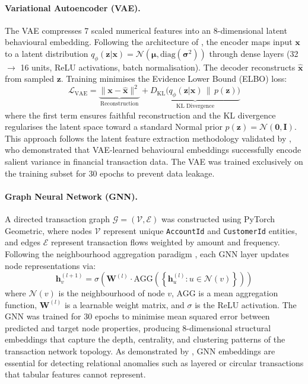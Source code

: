 \documentclass[a4paper,fleqn]{cas-sc}
\begin{document}
\paragraph{Variational Autoencoder (VAE).}
The VAE compresses 7 scaled numerical features into an 8-dimensional latent behavioural embedding. Following the architecture of \cite{Kingma2014VAE}, the encoder maps input $\mathbf{x}$ to a latent distribution $q_\phi(\mathbf{z}|\mathbf{x}) = \mathcal{N}(\boldsymbol{\mu}, \text{diag}(\boldsymbol{\sigma}^2))$ through dense layers (32 $\rightarrow$ 16 units, ReLU activations, batch normalisation). The decoder reconstructs $\hat{\mathbf{x}}$ from sampled $\mathbf{z}$. Training minimises the Evidence Lower Bound (ELBO) loss:
\begin{equation}
\mathcal{L}_{\text{VAE}} = \underbrace{\|\mathbf{x} - \hat{\mathbf{x}}\|^2}_{\text{Reconstruction}} + \underbrace{D_{\text{KL}}\bigl(q_\phi(\mathbf{z}|\mathbf{x}) \,\|\, p(\mathbf{z})\bigr)}_{\text{KL Divergence}}
\label{eq:vae_loss}
\end{equation}
where the first term ensures faithful reconstruction and the KL divergence regularises the latent space toward a standard Normal prior $p(\mathbf{z}) = \mathcal{N}(\mathbf{0}, \mathbf{I})$. This approach follows the latent feature extraction methodology validated by \cite{kungu2026hybrid}, who demonstrated that VAE-learned behavioural embeddings successfully encode salient variance in financial transaction data. The VAE was trained exclusively on the training subset for 30 epochs to prevent data leakage.

\paragraph{Graph Neural Network (GNN).}
A directed transaction graph $\mathcal{G} = (\mathcal{V}, \mathcal{E})$ was constructed using PyTorch Geometric, where nodes $\mathcal{V}$ represent unique \texttt{AccountId} and \texttt{CustomerId} entities, and edges $\mathcal{E}$ represent transaction flows weighted by amount and frequency. Following the neighbourhood aggregation paradigm \cite{Hamilton2017GraphSAGE}, each GNN layer updates node representations via:
\begin{equation}
\mathbf{h}_v^{(l+1)} = \sigma\!\left(\mathbf{W}^{(l)} \cdot \text{AGG}\!\left(\left\{\mathbf{h}_u^{(l)} : u \in \mathcal{N}(v)\right\}\right)\right)
\label{eq:gnn_agg}
\end{equation}
where $\mathcal{N}(v)$ is the neighbourhood of node $v$, AGG is a mean aggregation function, $\mathbf{W}^{(l)}$ is a learnable weight matrix, and $\sigma$ is the ReLU activation. The GNN was trained for 30 epochs to minimise mean squared error between predicted and target node properties, producing 8-dimensional structural embeddings that capture the depth, centrality, and clustering patterns of the transaction network topology. As demonstrated by \cite{kungu2026hybrid}, GNN embeddings are essential for detecting relational anomalies such as layered or circular transactions that tabular features cannot represent.
\end{document}
